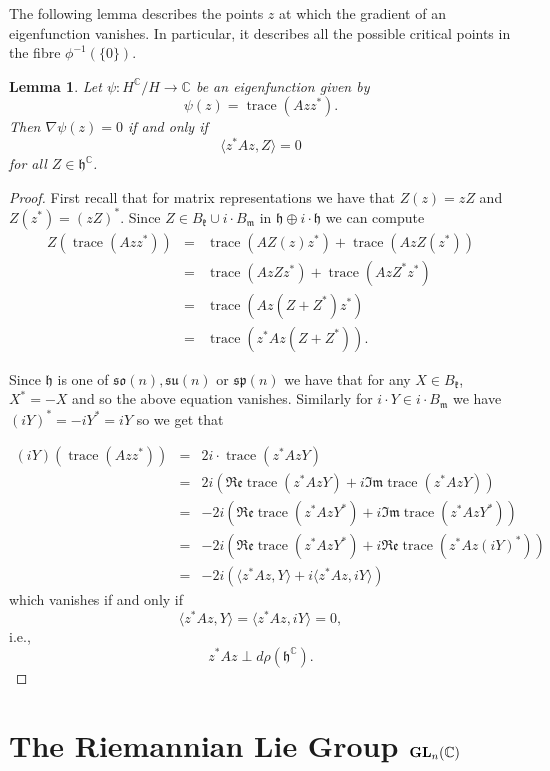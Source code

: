 \documentclass[11pt,reqno]{amsart}
\theoremstyle{plain}
\newtheorem{lemma}        [theorem]  {Lemma}
\theoremstyle{definition}
\numberwithin{equation}{section}
\def \cn{{\mathbb C}}
\def\Re{\mathfrak R\mathfrak e}
\def\Im{\mathfrak I\mathfrak m}
\def \h{\mathfrak{h}}
\def \k{\mathfrak{k}}
\def \m{\mathfrak{m}}
\def \GLC#1{\text{\bf GL}_{#1}(\cn)}
\def \so#1{\mathfrak{so}(#1)}
\def \su#1{\mathfrak{su}(#1)}
\def \sp#1{\mathfrak{sp}(#1)}
\DeclareMathOperator{\trace}{trace}
\numberwithin{equation}{section}
\begin{document}
The following lemma describes the points $z$ at which the gradient of an eigenfunction vanishes. In particular, it describes all the possible critical points in the fibre $\phi^{-1}(\{0\})$.
\begin{lemma}\label{lemma-critical-point}
	Let $\psi: H^\cn/H \to \cn$ be an eigenfunction given by
	$$ \psi(z) = \trace (A z z^*).$$
	Then  $\nabla\psi (z) = 0$ if and only if 
	$$ \langle z^* A z, Z \rangle =0$$ 
	for all $ Z \in \h^\cn$.
\end{lemma}
\begin{proof}
	First recall that for matrix representations we have that $Z(z) = z Z$ and $Z(z^*) = (z Z)^*$.
	Since $Z \in B_\k \cup i \cdot B_\m$ in $\h \oplus i \cdot \h$ we can compute
	\begin{eqnarray*}
		Z( \trace (A z z^*)) &=&  \trace (A Z(z) z^*) +  \trace (A z Z(z^*)) \\
		&=&  \trace (A z Z z^*) +  \trace (A z Z^* z^*) \\
		&=&  \trace (A z (Z+Z^*) z^*) \\
		&=&  \trace ( z^* A z (Z+Z^*)).
	\end{eqnarray*}
	
	Since $\h$ is one of $\so{n}, \su{n}$ or $\sp{n}$ we have that for any $X \in B_\k$, $X^* = -X$ and so the above equation vanishes.
	Similarly for $i \cdot Y \in i \cdot B_\m$ we have $(iY)^* = -iY^* = iY$ so we get that
	
	\begin{eqnarray*}
	(iY)( \trace (A z z^*)) &=& 2i \cdot \trace (z^* A z Y) \\
	&=& 2i (\Re \trace (z^* A z Y) + i \Im \trace (z^* A z Y)) \\
	&=& -2i (\Re \trace (z^* A z Y^*) + i \Im \trace (z^* A z Y^*)) \\
	&=& -2i (\Re \trace (z^* A z Y^*) + i \Re \trace (z^* A z (iY)^*)) \\
	&=& -2i ( \langle z^* A z,Y \rangle + i \langle z^* A z, iY \rangle)
	\end{eqnarray*}
which vanishes if and only if
$$ \langle z^* A z,Y \rangle = \langle z^* A z, iY \rangle = 0, $$
i.e.,
$$  z^* A z \perp d\rho(\h^\cn).$$
\end{proof}



\section{The Riemannian Lie Group $\GLC n$}
\end{document}
